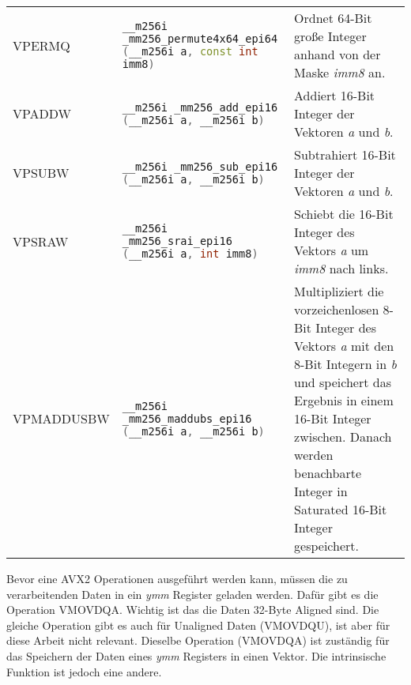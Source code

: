\begin{table}[h]
\begin{footnotesize}
\begin{tabularx}{\textwidth}{l X X}
      VPERMQ          & \lstinline[language=C++]{__m256i _mm256_permute4x64_epi64 (__m256i a, const int imm8)}    & Ordnet 64-Bit große Integer anhand von der Maske \emph{imm8} an.                                                                                                                                                                                              \\
      VPADDW          & \lstinline[language=C++]{__m256i _mm256_add_epi16 (__m256i a, __m256i b)}    & Addiert 16-Bit Integer der Vektoren \emph{a} und \emph{b}.                                                                                                                                                                                       \\
      VPSUBW          & \lstinline[language=C++]{__m256i _mm256_sub_epi16 (__m256i a, __m256i b)}    & Subtrahiert 16-Bit Integer der Vektoren \emph{a} und \emph{b}.                                                                                                                                                                                      \\
      VPSRAW          & \lstinline[language=C++]{__m256i _mm256_srai_epi16 (__m256i a, int imm8)}    & Schiebt die 16-Bit Integer des Vektors \emph{a} um \emph{imm8} nach links.                                                                                                                                                                         \\
      VPMADDUSBW      & \lstinline[language=C++]{__m256i _mm256_maddubs_epi16 (__m256i a, __m256i b)}    & Multipliziert die vorzeichenlosen 8-Bit Integer des Vektors \emph{a} mit den 8-Bit Integern in \emph{b} und speichert das Ergebnis in einem 16-Bit Integer zwischen. Danach werden benachbarte Integer in Saturated 16-Bit Integer gespeichert.                         \\
      \bottomrule
    \end{tabularx}
  \end{footnotesize}
  \rmfamily
\end{table}

Bevor eine \ac{AVX2} Operationen ausgeführt werden kann, müssen die zu verarbeitenden Daten in ein \emph{ymm} Register geladen werden. Dafür gibt es die Operation VMOVDQA. Wichtig ist das die Daten 32-Byte Aligned sind. Die gleiche Operation gibt es auch für Unaligned Daten (VMOVDQU), ist aber für diese Arbeit nicht relevant. Dieselbe Operation (VMOVDQA) ist zuständig für das Speichern der Daten eines \emph{ymm} Registers in einen Vektor. Die intrinsische Funktion ist jedoch eine andere.

